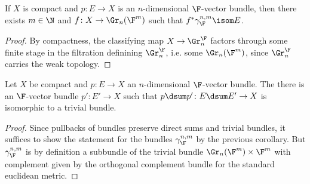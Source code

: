 \begin{corollary}
	If $X$ is compact and $p\colon E \to X$ is an $n$-dimensional $\F$-vector bundle, then there exists $m \in \N$ and $f\colon X \to \Gr_n(\F^m)$ such that $f^* \gamma_{\F}^{n, m} \isom E$. 
\end{corollary}
\begin{proof}
	By compactness, the classifying map $X \to \Gr^{\F}_n$ factors through some finite stage in the filtration definining $\Gr^{\F}_n$, i.e. some $\Gr_n(\F^m)$, since $\Gr^{\F}_n$ carries the weak topology.
\end{proof}
\begin{corollary}\label{prop:swanslemma}
	Let $X$ be compact and $p\colon E \to X$ an $n$-dimensional $\F$-vector bundle.
	The there is an $\F$-vector bundle $p'\colon E' \to X$ such that $p \dsum p'\colon E \dsum E' \to X$ is isomorphic to a trivial bundle.
\end{corollary}
\begin{proof}
	Since pullbacks of bundles preserve direct sums and trivial bundles, it suffices to show the statement for the bundles $\gamma_{\F}^{n , m}$ by the previous corollary.
	But $\gamma_{\F}^{n, m}$ is by definition a subbundle of the trivial bundle $\Gr_n(\F^m) \times \F^m$ with complement given by the orthogonal complement bundle for the standard euclidean metric.
\end{proof}
